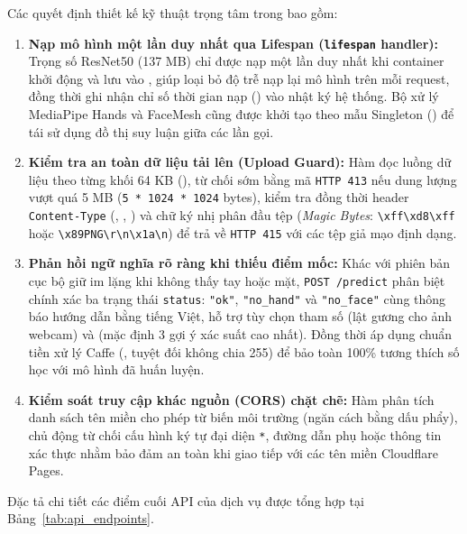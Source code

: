 Các quyết định thiết kế kỹ thuật trọng tâm trong  bao gồm:
\begin{enumerate}
    \item \textbf{Nạp mô hình một lần duy nhất qua Lifespan (\texttt{lifespan} handler):} Trọng số ResNet50 (137 MB) chỉ được nạp một lần duy nhất khi container khởi động và lưu vào , giúp loại bỏ độ trễ nạp lại mô hình trên mỗi request, đồng thời ghi nhận chỉ số thời gian nạp () vào nhật ký hệ thống. Bộ xử lý MediaPipe Hands và FaceMesh cũng được khởi tạo theo mẫu Singleton () để tái sử dụng đồ thị suy luận giữa các lần gọi.
    \item \textbf{Kiểm tra an toàn dữ liệu tải lên (Upload Guard):} Hàm  đọc luồng dữ liệu theo từng khối 64 KB (), từ chối sớm bằng mã \texttt{HTTP 413} nếu dung lượng vượt quá 5 MB (\texttt{5 * 1024 * 1024} bytes), kiểm tra đồng thời header \texttt{Content-Type} (, , ) và chữ ký nhị phân đầu tệp (\textit{Magic Bytes}: \texttt{\textbackslash xff\textbackslash xd8\textbackslash xff} hoặc \texttt{\textbackslash x89PNG\textbackslash r\textbackslash n\textbackslash x1a\textbackslash n}) để trả về \texttt{HTTP 415} với các tệp giả mạo định dạng.
    \item \textbf{Phản hồi ngữ nghĩa rõ ràng khi thiếu điểm mốc:} Khác với phiên bản cục bộ giữ im lặng khi không thấy tay hoặc mặt, \texttt{POST /predict} phân biệt chính xác ba trạng thái \texttt{status}: \texttt{"ok"}, \texttt{"no\_hand"} và \texttt{"no\_face"} cùng thông báo hướng dẫn bằng tiếng Việt, hỗ trợ tùy chọn tham số  (lật gương cho ảnh webcam) và  (mặc định 3 gợi ý xác suất cao nhất). Đồng thời áp dụng chuẩn tiền xử lý Caffe (, tuyệt đối không chia 255) để bảo toàn 100\% tương thích số học với mô hình đã huấn luyện.
    \item \textbf{Kiểm soát truy cập khác nguồn (CORS) chặt chẽ:} Hàm  phân tích danh sách tên miền cho phép từ biến môi trường  (ngăn cách bằng dấu phẩy), chủ động từ chối cấu hình ký tự đại diện \texttt{*}, đường dẫn phụ hoặc thông tin xác thực nhằm bảo đảm an toàn khi giao tiếp với các tên miền Cloudflare Pages.
\end{enumerate}

Đặc tả chi tiết các điểm cuối API của dịch vụ được tổng hợp tại Bảng~\ref{tab:api_endpoints}.

